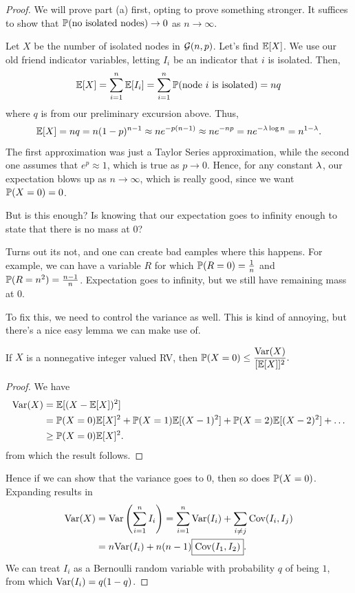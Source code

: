 \documentclass[11 pt]{scrartcl}
\begin{document}
\begin{proof}
    We will prove part (a) first, opting to prove something stronger. It suffices to show that $\mathbb P(\text{no isolated nodes}) \to 0$ as $n\to\infty$. 

    Let $X$ be the number of isolated nodes in $\mathcal G(n,p)$. Let's find $\mathbb E[X]$. We use our old friend indicator variables, letting $I_i$ be an indicator that $i$ is isolated. Then, 
    \[ \mathbb E[X] = \sum_{i = 1}^n \mathbb E[I_i] = \sum_{i = 1}^n \mathbb P(\text{node }i\text{ is isolated}) = nq\] 
    where $q$ is from our preliminary excursion above. Thus, 
    \[ \mathbb E[X] = nq = n(1-p)^{n-1} \approx ne^{-p(n-1)} \approx ne^{-np} = n e^{-\lambda\log n} = n^{1-\lambda}.\] 
    The first approximation was just a Taylor Series approximation, while the second one assumes that $e^p \approx 1$, which is true as $p\to 0$. Hence, for any constant $\lambda$, our expectation blows up as $n\to \infty$, which is really good, since we want $\mathbb P(X = 0) = 0$. 

    But is this enough? Is knowing that our expectation goes to infinity enough to state that there is no mass at $0$? 

    Turns out its not, and one can create bad eamples where this happens. For example, we can have a variable $R$ for which $\mathbb P(R = 0) = \frac{1}{n}$ and $\mathbb P(R = n^2) = \frac{n-1}{n}$. Expectation goes to infinity, but we still have remaining mass at $0$. 

    To fix this, we need to control the variance as well. This is kind of annoying, but there's a nice easy lemma we can make use of. 

    \begin{lemma}
        If $X$ is a nonnegative integer valued RV, then $\mathbb P(X = 0) \leq \dfrac{\text{Var}(X)}{[\mathbb E[X]]^2}.$ 
    \end{lemma}
    \begin{proof}
        We have 
        \begin{align*}
            \text{Var}(X) &= \mathbb E[(X - \mathbb E[X])^2] \\
                    &= \mathbb P(X = 0)\mathbb E[X]^2 + \mathbb P(X=1)\mathbb E[(X-1)^2] + \mathbb P(X=2)\mathbb E[(X-2)^2] + \dots \\ 
                    &\geq \mathbb P(X= 0) \mathbb E[X]^2.
        \end{align*}
        from which the result follows. 
    \end{proof}
    
    Hence if we can show that the variance goes to $0$, then so does $\mathbb P(X = 0)$. Expanding results in 
    \begin{align*}
        \text{Var}(X) &= \text{Var}\left(\sum_{i=1}^n I_i\right) = \sum_{i=1}^n \text{Var}(I_i) + \sum_{i\not= j} \text{Cov}(I_i, I_j)  \\ 
                &= n\text{Var}(I_i) + n(n-1)\boxed{\text{Cov}(I_1, I_2)}.
    \end{align*}
    We can treat $I_i$ as a Bernoulli random variable with probability $q$ of being $1$, from which $\text{Var}(I_i) = q(1-q)$.


\end{proof}
\end{document}
